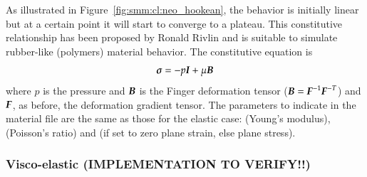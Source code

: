As illustrated in Figure~\ref{fig:smm:cl:neo_hookean}, the behavior is initially linear but at a certain point it will start to converge to a plateau.
This constitutive relationship has been proposed by Ronald Rivlin\cite{ronald-neohooken} and is suitable to simulate rubber-like (\eg polymers) material behavior. The constitutive equation is
\begin{equation}
  \boldsymbol{\sigma } = -p \boldsymbol{I} + \mu \boldsymbol{B}
\end{equation}
where $p$ is the pressure and $\boldsymbol{B}$ is the Finger deformation tensor ($\boldsymbol{B}=\boldsymbol{F}^{-1}\boldsymbol{F}^{-T}$) and $\boldsymbol{F}$, as before, the deformation gradient tensor.
The parameters to indicate in the material file are the same as those for the elastic case:  (Young's modulus),  (Poisson's ratio) and  (if set to zero plane strain, else plane stress).

\subsubsection{Visco-elastic (IMPLEMENTATION TO VERIFY!!)}

